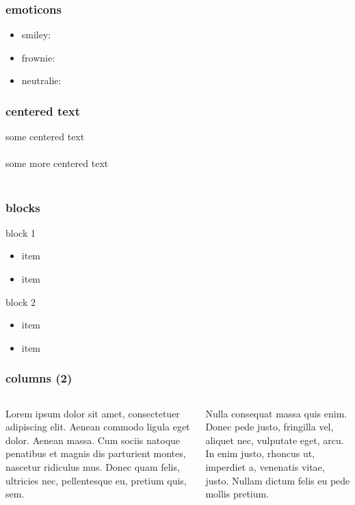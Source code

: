 \begin{frame}
\frametitle{emoticons}
\begin{itemize}
\item smiley: \smiley
\item frownie: \frownie
\item neutralie: \neutralie
\end{itemize}
\end{frame}

\begin{frame}
\frametitle{centered text}
\begin{center}
some centered text\\\mbox{}\\some more centered text\\\mbox{}\\
\end{center}
\end{frame}

\begin{frame}
\frametitle{blocks}
\begin{block}{block 1}
\begin{itemize}
\item item
\item item
\end{itemize}
\end{block}
\begin{block}{block 2}
\begin{itemize}
\item item
\item item
\end{itemize}
\end{block}
\end{frame}

\begin{frame}
\frametitle{columns (2)}
\begin{columns}
\begin{column}[t]{.5\textwidth}
\justifying
Lorem ipsum dolor sit amet, consectetuer adipiscing elit. Aenean commodo ligula eget dolor. Aenean massa. Cum sociis natoque penatibus et magnis dis parturient montes, nascetur ridiculus mus. Donec quam felis, ultricies nec, pellentesque eu, pretium quis, sem.
\end{column}
\hfill
\begin{column}[t]{.5\textwidth}
\justifying
Nulla consequat massa quis enim. Donec pede justo, fringilla vel, aliquet nec, vulputate eget, arcu. In enim justo, rhoncus ut, imperdiet a, venenatis vitae, justo. Nullam dictum felis eu pede mollis pretium.
\end{column}%
\end{columns}
\end{frame}


